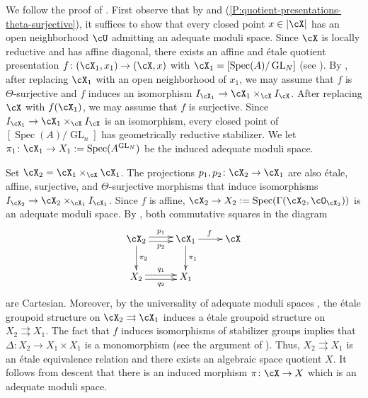 \documentclass[a4paper]{amsart}
\numberwithin{equation}{section}
\theoremstyle{plain}
\theoremstyle{definition}
\DeclareMathOperator{\Spec}{Spec}
\DeclareMathOperator{\GL}{GL}
\newcommand{\co}{\colon}
\newcommand{\oh}{\cO}
\begin{document}
	We follow the proof of \cite[Thm.~2.1]{afs-existence}.  First observe that by  and (\ref{P:quotient-presentations-theta-surjective}), it suffices to show that every closed point $x \in |\cX|$ has an  open neighborhood $\cU$ admitting an adequate moduli space.
	Since $\cX$ is locally reductive and has affine diagonal, there exists an affine and \'etale quotient presentation $f \co (\cX_1, x_1) \to (\cX,x)$ with $\cX_1=[\Spec(A) / \GL_N]$ (see ).
	By , after replacing $\cX_1$ with an open neighborhood of $x_1$, we may assume that $f$ is $\Theta$-surjective and $f$ induces an isomorphism $I_{\cX_1} \to \cX_1 \times_{\cX} I_{\cX}$.
    After replacing $\cX$ with $f(\cX_1)$, we may assume that $f$ is surjective.  Since $I_{\cX_1} \to \cX_1 \times_{\cX} I_{\cX}$ is an isomorphism, every closed point of $[\Spec(A) / \GL_n]$ has geometrically reductive stabilizer. 
	We let $\pi_1 \co \cX_1 \to X_1 := \Spec(A^{\GL_N})$ be the induced adequate moduli space. 

	Set $\cX_2 = \cX_1 \times_{\cX} \cX_1$. The projections $p_1, p_2\co   \cX_2 \to \cX_1$ are also   \'etale, affine, surjective, and $\Theta$-surjective morphisms that induce isomorphisms $I_{\cX_2} \to \cX_2 \times_{\cX_1} I_{\cX_1}$.  Since $f$ is affine, $\cX_2 \to X_2:= \Spec( \Gamma(\cX_2, \oh_{\cX_2}) )$ is an adequate moduli space.
	By , both commutative squares in the diagram
	\begin{equation} \label{E:existence-etale-equivalence-relation}
	\begin{split}
	\xymatrix{
	\cX_2 \ar@<.5ex>[r]^{p_1} \ar@<-.5ex>[r]_{p_2} \ar[d]^{\pi_2}  
	& \cX_1 \ar[r]^f \ar[d]^{\pi_1}    & \cX \\
	X_2 \ar@<.5ex>[r]^{q_1} \ar@<-.5ex>[r]_{q_2}  & X_1
	}
	\end{split}
	\end{equation}
	are Cartesian.  Moreover, by the universality of adequate moduli spaces \cite[Thm.~3.12]{ahr2}, the \'etale groupoid structure on $\cX_2 \rightrightarrows \cX_1$ induces a \'etale groupoid structure on $X_2 \rightrightarrows X_1$.  The fact that $f$ induces isomorphisms of stabilizer groups implies that $\Delta\co  X_2 \to X_1 \times X_1$ is a monomorphism (see the argument of \cite[Prop.~3.1]{afs-existence}). Thus, 
	$X_2 \rightrightarrows X_1$ is an \'etale equivalence relation and there exists an algebraic space quotient $X$.  It follows from descent that there is an induced morphism $\pi \co \cX \to X$ which is an adequate moduli space. 
\end{document}
